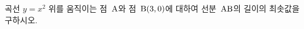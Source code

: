 곡선 $y=x^2$ 위를 움직이는 점~$\mathrm{A}$와 점~$\mathrm{B}(3{,}\mkern3mu\mathopen{}0)$에 대하여 선분~$\mathrm{AB}$의 길이의 최솟값을 구하시오.
